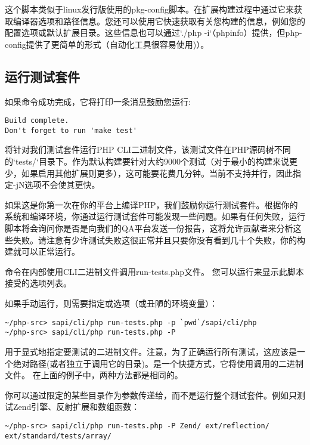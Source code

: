 这个脚本类似于linux发行版使用的pkg-config脚本。在扩展构建过程中通过它来获取编译器选项和路径信息。您还可以使用它快速获取有关您构建的信息，例如您的配置选项或默认扩展目录。这些信息也可以通过`./php -i`（phpinfo）提供，但php-config提供了更简单的形式（自动化工具很容易使用)）。


\subsection{运行测试套件}

如果命令成功完成，它将打印一条消息鼓励您运行:

\begin{lstlisting}[language=shell]
Build complete.
Don't forget to run 'make test'
\end{lstlisting}

将针对我们测试套件运行PHP CLI二进制文件，该测试文件在PHP源码树不同的`tests/`目录下。作为默认构建要针对大约9000个测试（对于最小的构建来说更少，如果启用其他扩展则更多），这可能要花费几分钟。当前不支持并行，因此指定-jN选项不会使其更快。

如果这是你第一次在你的平台上编译PHP，我们鼓励你运行测试套件。根据你的系统和编译环境，你通过运行测试套件可能发现一些问题。如果有任何失败，运行脚本将会询问你是否是向我们的QA平台发送一份报告，这将允许贡献者来分析这些失败。请注意有少许测试失败这很正常并且只要你没有看到几十个失败，你的构建就可以正常运行。

命令在内部使用CLI二进制文件调用run-tests.php文件。 您可以运行来显示此脚本接受的选项列表。

如果手动运行，则需要指定或选项（或丑陋的环境变量）：

\begin{lstlisting}[language=shell]
~/php-src> sapi/cli/php run-tests.php -p `pwd`/sapi/cli/php
~/php-src> sapi/cli/php run-tests.php -P
\end{lstlisting}

用于显式地指定要测试的二进制文件。注意，为了正确运行所有测试，这应该是一个绝对路径(或者独立于调用它的目录)。是一个快捷方式，它将使用调用的二进制文件。 在上面的例子中，两种方法都是相同的。

你可以通过限定的某些目录作为参数传递给，而不是运行整个测试套件。例如只测试Zend引擎、反射扩展和数组函数：

\begin{lstlisting}[language=shell]
~/php-src> sapi/cli/php run-tests.php -P Zend/ ext/reflection/ ext/standard/tests/array/
\end{lstlisting}

